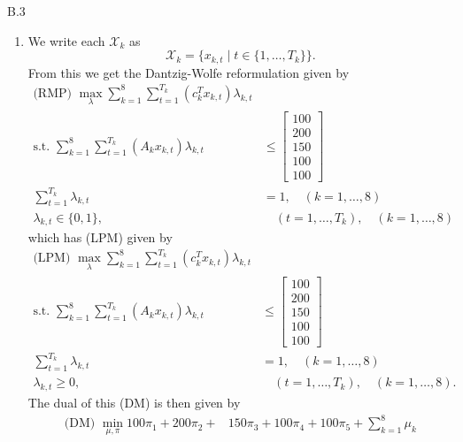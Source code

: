 \documentclass[a4paper]{article}
\begin{document}
\begin{exercise}{B.3}
\begin{enumerate}[label=(\roman*)]
      \item We write each $ \mathscr{X}_k $ as
        \begin{equation*}
          \mathscr{X}_k = \{x_{k,t} \mid t \in \{1,\ldots, T_k\}\}
        .\end{equation*}
        From this we get the Dantzig-Wolfe reformulation given by
        \begin{align*}
          \text{(RMP)  } \max_{\lambda} \sum_{k = 1}^{8} \sum_{t = 1}^{T_k} (c_k^{T}x_{k,t})\lambda_{k,t}& \\
          \text{s.t. } \sum_{k = 1}^{8} \sum_{t = 1}^{T_k} (A_k x_{k,t})\lambda_{k,t} &\leq \begin{bmatrix}
            100 \\
            200 \\
            150 \\
            100 \\
            100
          \end{bmatrix} \\
            \sum_{t = 1}^{T_k} \lambda_{k,t} &= 1, \quad (k = 1,\ldots, 8) \\
            \lambda_{k,t} \in \{0,1\},& \quad (t=1, \ldots, T_k), \quad (k = 1,\ldots, 8)
        \end{align*}
        which has (LPM) given by
        \begin{align*}
          \text{(LPM)  } \max_{\lambda} \sum_{k = 1}^{8} \sum_{t = 1}^{T_k} (c_k^{T}x_{k,t})\lambda_{k,t}& \\
          \text{s.t. } \sum_{k = 1}^{8} \sum_{t = 1}^{T_k} (A_k x_{k,t})\lambda_{k,t} &\leq \begin{bmatrix}
            100 \\
            200 \\
            150 \\
            100 \\
            100
          \end{bmatrix} \\
            \sum_{t = 1}^{T_k} \lambda_{k,t} &= 1, \quad (k = 1,\ldots, 8) \\
            \lambda_{k,t} \geq 0,& \quad (t=1, \ldots, T_k), \quad (k = 1,\ldots, 8)
        .\end{align*}
        The dual of this (DM) is then given by
        \begin{align*}
          \text{(DM)  } \min_{\mu,\pi} 100 \pi_1 + 200\pi_2 + &150 \pi_3 + 100\pi_4 + 100 \pi_5 + \sum_{k = 1}^{8} \mu_k \\

\end{align*}
\end{enumerate}
\end{exercise}
\end{document}
